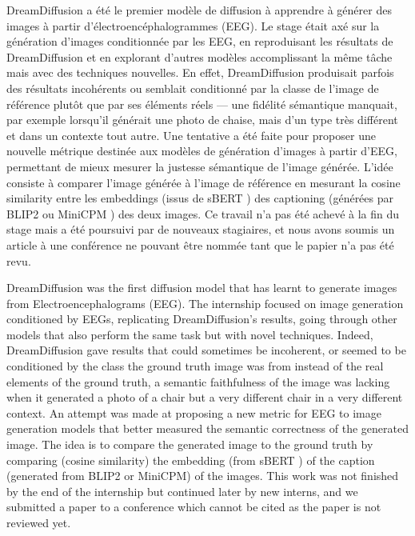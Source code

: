 DreamDiffusion \cite{dreamdiffusion} a été le premier modèle de diffusion à
apprendre à générer des images à partir d'électroencéphalogrammes (EEG). Le
stage était axé sur la génération d'images conditionnée par les EEG, en
reproduisant les résultats de DreamDiffusion et en explorant d'autres modèles
accomplissant la même tâche mais avec des techniques nouvelles. En effet,
DreamDiffusion produisait parfois des résultats incohérents ou semblait
conditionné par la classe de l'image de référence plutôt que par ses éléments
réels — une fidélité sémantique manquait, par exemple lorsqu'il générait une
photo de chaise, mais d'un type très différent et dans un contexte tout autre.
Une tentative a été faite pour proposer une nouvelle métrique destinée aux
modèles de génération d'images à partir d'EEG, permettant de mieux mesurer la
justesse sémantique de l'image générée. L'idée consiste à comparer l'image
générée à l'image de référence en mesurant la cosine similarity entre les
embeddings (issus de sBERT \cite{sbert}) des captioning (générées par BLIP2
\cite{blip2} ou MiniCPM \cite{minicpm}) des deux images.  Ce travail n'a pas été
achevé à la fin du stage mais a été poursuivi par de nouveaux stagiaires, et
nous avons soumis un article à une conférence ne pouvant être nommée tant que le
papier n'a pas été revu. 

DreamDiffusion \cite{dreamdiffusion} was the first diffusion model that has
learnt to generate images from Electroencephalograms (EEG). The internship
focused on image generation conditioned by EEGs, replicating DreamDiffusion's
results, going through other models that also perform the same task but with
novel techniques.  Indeed, DreamDiffusion gave results that could sometimes be
incoherent, or seemed to be conditioned by the class the ground truth image was
from instead of the real elements of the ground truth, a semantic faithfulness
of the image was lacking when it generated a photo of a chair but a very
different chair in a very different context. An attempt was made at proposing a
new metric for EEG to image generation models that better measured the semantic
correctness of the generated image. The idea is to compare the generated image
to the ground truth by comparing (cosine similarity) the embedding (from sBERT
\cite{sbert}) of the caption (generated from BLIP2\cite{blip2} or
MiniCPM\cite{minicpm}) of the images. This work was not finished by the end of
the internship but continued later by new interns, and we submitted a paper to
a conference which cannot be cited as the paper is not reviewed yet.